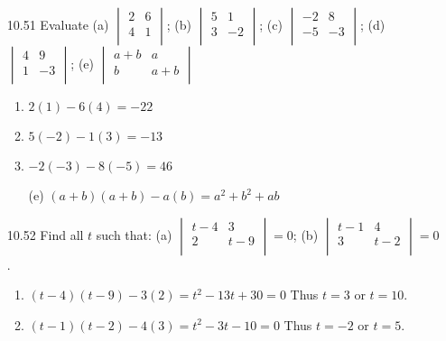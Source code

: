 \documentclass[12pt]{article}
\theoremstyle{definition}
\theoremstyle{plain}
\begin{document}
\begin{enumerate}
\item[10.51]Evaluate (a) $\begin{vmatrix}2&6\\4&1\\\end{vmatrix}$; (b) $\begin{vmatrix}5&1\\3&-2\\\end{vmatrix}$; (c) $\begin{vmatrix}-2&8\\-5&-3\\\end{vmatrix}$; (d) $\begin{vmatrix}4&9\\1&-3\\\end{vmatrix}$; (e) $\begin{vmatrix}a+b&a\\b&a+b\\\end{vmatrix}$
	\begin{enumerate}
	\item $2(1)-6(4) = -22$
	\item $5(-2)-1(3) = -13$
	\item $-2(-3)-8(-5) = 46$
	\item[(e)] $(a+b)(a+b)-a(b) = a^2+b^2+ab$
	\end{enumerate}

\item[10.52]Find all $t$ such that: (a) $\begin{vmatrix}t-4&3\\2&t-9\\\end{vmatrix} = 0$; (b) $\begin{vmatrix}t-1&4\\3&t-2\\\end{vmatrix} = 0$.
	\begin{enumerate}
	\item $(t-4)(t-9)-3(2) = t^2-13t+30 = 0$ Thus $t=3$ or $t=10$.
	\item $(t-1)(t-2)-4(3) = t^2-3t-10 = 0$ Thus $t=-2$ or $t=5$.
	\end{enumerate}


\end{enumerate}
\end{document}
